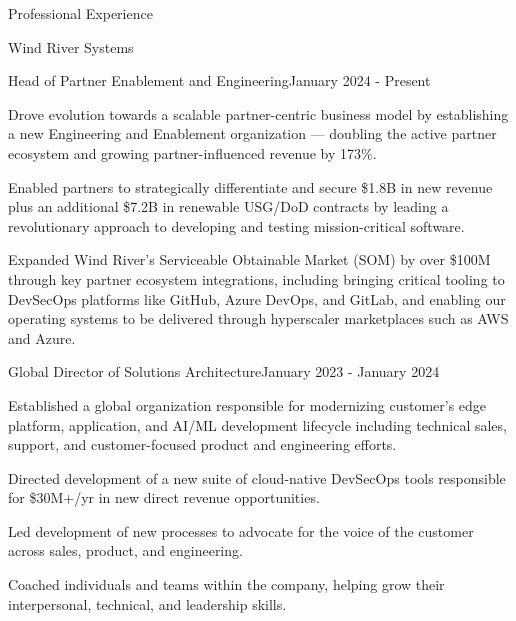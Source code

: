\documentclass{resume} %
\begin{document}



\begin{rSection}{Professional Experience}

  \begin{rCompany}{Wind River Systems}{}{}
    \begin{rRole}{Head of Partner Enablement and Engineering}{}{January 2024 - Present}
      \item Drove evolution towards a scalable partner-centric business model by establishing a new Engineering and Enablement organization --- doubling the active partner ecosystem and growing partner-influenced revenue by 173\%.
      \item Enabled partners to strategically differentiate and secure \$1.8B in new revenue plus an additional \$7.2B in renewable USG/DoD contracts by leading a revolutionary approach to developing and testing mission-critical software.
      \item Expanded Wind River's Serviceable Obtainable Market (SOM) by over \$100M through key partner ecosystem integrations, including bringing critical tooling to DevSecOps platforms like GitHub, Azure DevOps, and GitLab, and enabling our operating systems to be delivered through hyperscaler marketplaces such as AWS and Azure.
    \end{rRole}
    
    \begin{rRole}{Global Director of Solutions Architecture}{}{January 2023 - January 2024}
      \item Established a global organization responsible for modernizing customer's edge platform, application, and AI/ML development lifecycle including technical sales, support, and customer-focused product and engineering efforts.
      \item Directed development of a new suite of cloud-native DevSecOps tools responsible for \$30M+/yr in new direct revenue opportunities.
      \item Led development of new processes to advocate for the voice of the customer across sales, product, and engineering.
      \item Coached individuals and teams within the company, helping grow their interpersonal, technical, and leadership skills.
    \end{rRole}
  \end{rCompany}
  

\end{rSection}
\end{document}

